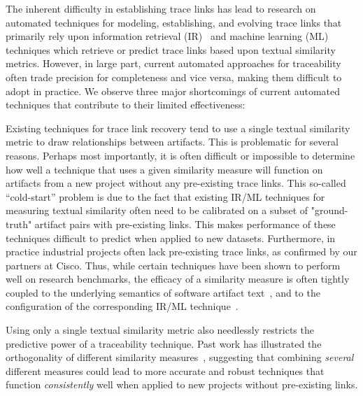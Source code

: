 The inherent difficulty in establishing trace links has lead to research on automated techniques for modeling, establishing, and evolving trace links that primarily rely upon information retrieval (IR)~\citep{Lucia:ICSM'04,Dekhtyar:RE'07,Asuncion:ICSE'10,McMillan:TEFSE'09,Gethers:ICSM'11,DeLucia:ASE'08,DeLucia:EMSE'09,Mahmoud:ICPC'12,Antoniol:ICSE'00,Marcus:ICSE'03,Mills:ICSME18,Jiang:ASE'08,Kuang:SANER'17} and machine learning (ML)~\citep{Mahmoud:RE'16,Guo:MSR'16,Asuncion:ICSE'10,Spanoudakis:SEKE'03,Falessi:EMSE17} techniques which retrieve or predict trace links based upon textual similarity metrics.  However, in large part, current automated approaches for traceability often trade precision for completeness and vice versa, making them difficult to adopt in practice. We observe three major shortcomings of current automated techniques that contribute to their limited effectiveness:

 Existing techniques for trace link recovery tend to use a single textual similarity metric to draw relationships between artifacts. This is problematic for several reasons. Perhaps most importantly, it is often difficult or impossible to determine how well a technique that uses a given similarity measure will function on artifacts from a new project without any pre-existing trace links. This so-called ``cold-start'' problem is due to the fact that existing IR/ML techniques for measuring textual similarity often need to be calibrated on a subset of "ground-truth" artifact pairs with pre-existing links. This makes performance of these techniques difficult to predict when applied to new datasets. Furthermore, in practice industrial projects often lack pre-existing trace links, as confirmed by our  partners at Cisco. Thus, while certain techniques have been shown to perform well on research benchmarks, the efficacy of a similarity measure is often tightly coupled to the underlying semantics of software artifact text~\citep{Lohar:FSE'13,Guo:ICSE'17,Biggerstaff:ACM'94}, and to the configuration of the corresponding IR/ML technique~\citep{Oliveto:ICPC'10}. 

Using only a single textual similarity metric also needlessly restricts the predictive power of a traceability technique. Past work has illustrated the orthogonality of different similarity measures~\citep{Oliveto:ICPC'10}, suggesting that combining \textit{several} different measures could lead to more accurate and robust techniques that function \textit{consistently} well when applied to new projects without pre-existing links.

